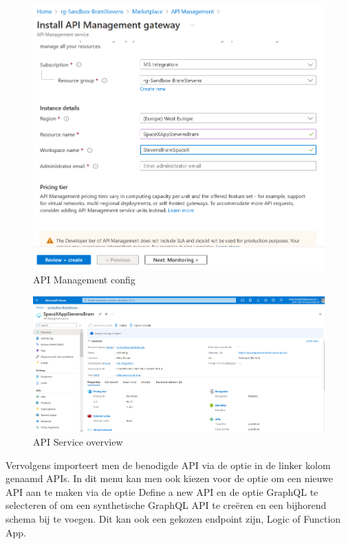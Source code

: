 \begin{figure}
    \centering
    \includegraphics[scale=0.60]{../img/APIManagement.png}
    \caption{\label{fig:APIM}API Management config}
\end{figure}

\begin{figure}
    \centering
    \includegraphics[scale=0.40]{../img/APIService.png}
    \caption{\label{fig:APIS}API Service overview}
\end{figure}

Vervolgens importeert men de benodigde API via de optie in de linker kolom genaamd APIs. In dit menu kan men ook kiezen voor de optie om een nieuwe API aan te maken via de optie Define a new API en de optie GraphQL te selecteren of om een synthetische GraphQL API te creëren en een bijhorend schema bij te voegen. Dit kan ook een gekozen endpoint zijn, Logic of Function App.

